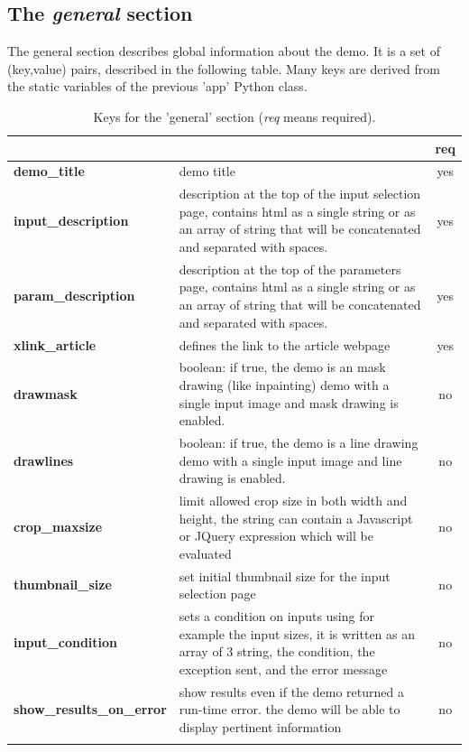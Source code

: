 \subsection{The \emph{general} section}
The general section describes global information about the demo.
It is a set of  (key,value) pairs, described in the following table.
Many keys are derived from the static variables of the previous 'app' Python class.\\
% 
\begin{longtable}{|>{\bf}L{\linewidth}|L{\linewidth}|c|}
\hline
      &  & {\bf req} 
\tabularnewline \hline \hline
 demo\_title         & demo title & yes\\ \hline
 input\_description  & description at the top of the input selection page, 
                      contains html as a single string or as an array of string
                      that will be concatenated and separated with spaces.
                     & yes \\ \hline
 param\_description  & description at the top of the para\-meters page,
                      contains html as a single string or as an array of string
                      that will be concatenated and separated with spaces.
                      & yes
                      \\ \hline
 xlink\_article     & defines the link to the article webpage & yes  \\ \hline
 drawmask           & boolean: if true, the demo is an mask drawing (like inpainting) demo with a 
                      single input image and mask drawing is enabled. & no \\ \hline
 drawlines          & boolean: if true, the demo is a line drawing demo with a 
                      single input image and line drawing is enabled. & no \\ \hline
 crop\_maxsize      & limit allowed crop size in both width and height, the string
                      can contain a Javascript or JQuery expression which will be evaluated & no \\ \hline
 thumbnail\_size    & set initial thumbnail size for the input selection page & no \\ \hline
 input\_condition   & sets a condition on inputs using for example the input sizes,
                      it is written as an array of 3 string, the condition,
                      the exception sent, and the error message& no \\ \hline
 show\_results\_on\-\_error & show results even if the demo returned a run-time error.
                    the demo will be able to display pertinent information & no \\ \hline
\caption{Keys for the 'general' section ({\em req} means required).}
\end{longtable}

